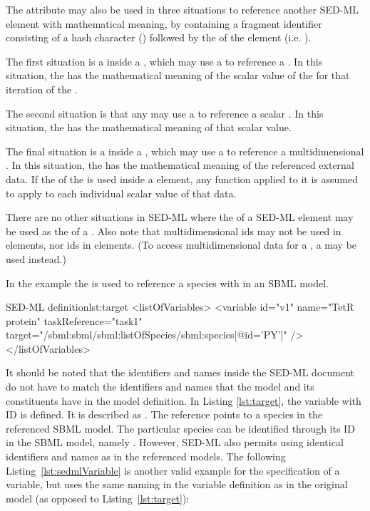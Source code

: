 \begin{blockChanged}
The  attribute may also be used in three situations to reference another SED-ML element with mathematical meaning, by containing a fragment identifier consisting of a hash character (\code{\#}) followed by the \SId of the element (i.e. ).

The first situation is a \Variable inside a \RepeatedTask, which may use a  to reference a \Range.  In this situation, the \Variable has the mathematical meaning of the scalar value of the \Range for that iteration of the \RepeatedTask.

The second situation is that any \Variable may use a  to reference a scalar \DataSource.  In this situation, the \Variable has the mathematical meaning of that scalar value.

The final situation is a \Variable inside a \DataGenerator, which may use a  to reference a multidimensional \DataSource.  In this situation, the \Variable has the mathematical meaning of the referenced external data.  If the  of the \Variable is used inside a \Math element, any function applied to it is assumed to apply to each individual scalar value of that data.

There are no other situations in SED-ML where the  of a SED-ML element may be used as the  of a \Variable.  Also note that multidimensional \DataSource ids may not be used in \RepeatedTask elements, nor \Range ids in \DataGenerator elements.  (To access multidimensional data for a \Range, a \DataRange may be used instead.)
\end{blockChanged}

In the example the  is used to reference a species with  in an SBML model.
\begin{myXmlLst}{SED-ML  definition}{lst:target}
<listOfVariables>
	<variable id="v1" name="TetR protein" taskReference="task1" 
		target="/sbml:sbml/sbml:listOfSpecies/sbml:species[@id='PY']" />
</listOfVariables>
\end{myXmlLst}

It should be noted that the identifiers and names inside the SED-ML document do not have to match the identifiers and names that the model and its constituents have in the model definition. In Listing \ref{lst:target}, the variable with ID  is defined. It is described as . The reference points to a species in the referenced SBML model. The particular species can be identified through its ID in the SBML model, namely . However, SED-ML also permits using identical identifiers and names as in the referenced models. The following Listing~\vref{lst:sedmlVariable} is another valid example for the specification of a variable, but uses the same naming in the variable definition as in the original model (as opposed to Listing~\ref{lst:target}):


